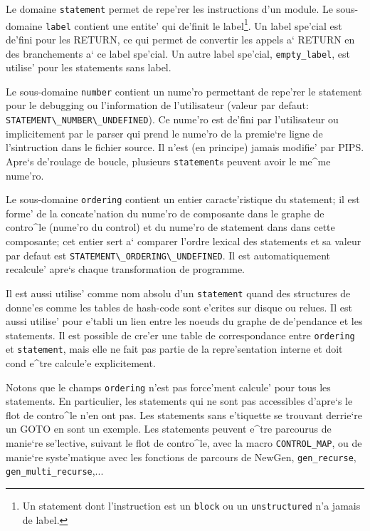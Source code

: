 {}

Le domaine \verb/statement/ permet de
repe'rer les instructions d'un module.  Le sous-domaine \verb/label/
contient une entite' qui de'finit le label\footnote{Un statement dont
l'instruction est un \verb/block/ ou un \verb/unstructured/ n'a jamais
de label.}. Un label spe'cial est de'fini pour les RETURN, ce qui permet
de convertir les appels a` RETURN en des branchements a` ce label
spe'cial. Un autre label spe'cial, \verb/empty_label/, est utilise' pour
les statements sans label.

Le sous-domaine \verb/number/ contient un nume'ro permettant de repe'rer
le statement pour le debugging ou l'information de l'utilisateur (valeur
par defaut: \verb+STATEMENT\_NUMBER\_UNDEFINED+). Ce nume'ro est de'fini
par l'utilisateur ou implicitement par le parser qui prend le nume'ro de
la premie`re ligne de l'sintruction dans le fichier source. Il n'est (en
principe) jamais modifie' par PIPS. Apre`s de'roulage de boucle,
plusieurs \verb/statement/s peuvent avoir le me^me nume'ro.

Le sous-domaine \verb/ordering/ contient un entier caracte'ristique du
statement; il est forme' de la concate'nation du nume'ro de composante
dans le graphe de contro^le (nume'ro du control) et du nume'ro de
statement dans dans cette composante; cet entier sert a` comparer
l'ordre lexical des statements et sa valeur par defaut est
\verb+STATEMENT\_ORDERING\_UNDEFINED+. Il est automatiquement recalcule'
apre`s chaque transformation de programme. 

Il est aussi utilise' comme nom absolu d'un \verb/statement/ quand des
structures de donne'es comme les tables de hash-code sont e'crites sur
disque ou relues. Il est aussi utilise' pour e'tabli un lien entre les
noeuds du graphe de de'pendance et les statements. Il est possible de
cre'er une table de correspondance entre \verb/ordering/ et
\verb/statement/, mais elle ne fait pas partie de la repre'sentation
interne et doit cond e^tre calcule'e explicitement.

Notons que le champs \verb/ordering/ n'est pas force'ment calcule' pour
tous les statements. En particulier, les statements qui ne sont pas
accessibles d'apre`s le flot de contro^le n'en ont pas. Les statements
sans e'tiquette se trouvant derrie`re un GOTO en sont un exemple. Les
statements peuvent e^tre parcourus de manie`re se'lective, suivant le
flot de contro^le, avec la macro \verb/CONTROL_MAP/, ou de manie`re
syste'matique avec les fonctions de parcours de NewGen,
\verb/gen_recurse/,
\verb/gen_multi_recurse/,...

